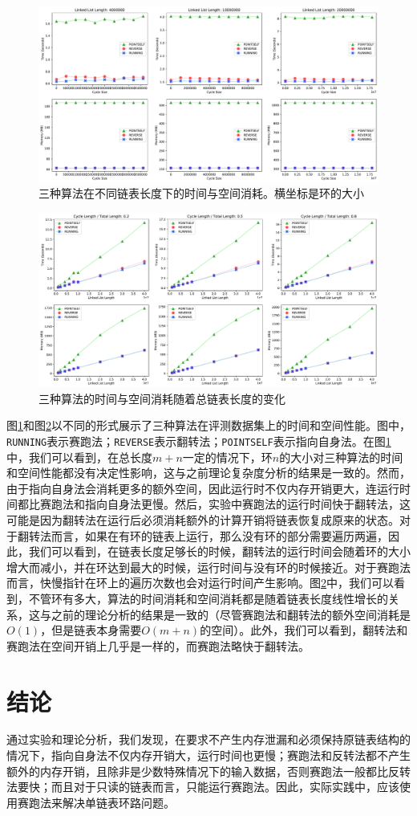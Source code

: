 \documentclass[UTF8]{ctexart}
\begin{document}
\begin{figure}[h]
\includegraphics[width=\textwidth]{fig.pdf}
\caption{三种算法在不同链表长度下的时间与空间消耗。横坐标是环的大小}
\label{fig1}
\end{figure}

\begin{figure}
\includegraphics[width=\textwidth]{fig2.pdf}
\caption{三种算法的时间与空间消耗随着总链表长度的变化}
\label{fig2}
\end{figure}

图\ref{fig1}和图\ref{fig2}以不同的形式展示了三种算法在评测数据集上的时间和空间性能。图中，\texttt{RUNNING}表示赛跑法；\texttt{REVERSE}表示翻转法；\texttt{POINTSELF}表示指向自身法。在图\ref{fig1}中，我们可以看到，在总长度$m+n$一定的情况下，环$n$的大小对三种算法的时间和空间性能都没有决定性影响，这与之前理论复杂度分析的结果是一致的。然而，由于指向自身法会消耗更多的额外空间，因此运行时不仅内存开销更大，连运行时间都比赛跑法和指向自身法更慢。然后，实验中赛跑法的运行时间快于翻转法，这可能是因为翻转法在运行后必须消耗额外的计算开销将链表恢复成原来的状态。对于翻转法而言，如果在有环的链表上运行，那么没有环的部分需要遍历两遍，因此，我们可以看到，在链表长度足够长的时候，翻转法的运行时间会随着环的大小增大而减小，并在环达到最大的时候，运行时间与没有环的时候接近。对于赛跑法而言，快慢指针在环上的遍历次数也会对运行时间产生影响。图\ref{fig2}中，我们可以看到，不管环有多大，算法的时间消耗和空间消耗都是随着链表长度线性增长的关系，这与之前的理论分析的结果是一致的（尽管赛跑法和翻转法的额外空间消耗是$O(1)$，但是链表本身需要$O(m+n)$的空间）。此外，我们可以看到，翻转法和赛跑法在空间开销上几乎是一样的，而赛跑法略快于翻转法。

\section{结论}

通过实验和理论分析，我们发现，在要求不产生内存泄漏和必须保持原链表结构的情况下，指向自身法不仅内存开销大，运行时间也更慢；赛跑法和反转法都不产生额外的内存开销，且除非是少数特殊情况下的输入数据，否则赛跑法一般都比反转法要快；而且对于只读的链表而言，只能运行赛跑法。因此，实际实践中，应该使用赛跑法来解决单链表环路问题。




\end{document}
